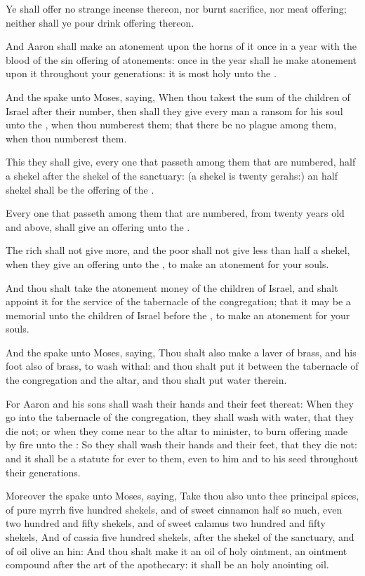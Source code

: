 \Verse Ye shall offer no strange incense thereon, nor burnt sacrifice, nor meat offering; neither shall ye pour drink offering thereon.

\Verse And Aaron shall make an atonement upon the horns of it once in a year with the blood of the sin offering of atonements: once in the year shall he make atonement upon it throughout your generations: it is most holy unto the \LORD.

\Verse And the \LORD spake unto Moses, saying, \Verse When thou takest the sum of the children of Israel after their number, then shall they give every man a ransom for his soul unto the \LORD, when thou numberest them; that there be no plague among them, when thou numberest them.

\Verse This they shall give, every one that passeth among them that are numbered, half a shekel after the shekel of the sanctuary: (a shekel is twenty gerahs:) an half shekel shall be the offering of the \LORD.

\Verse Every one that passeth among them that are numbered, from twenty years old and above, shall give an offering unto the \LORD.

\Verse The rich shall not give more, and the poor shall not give less than half a shekel, when they give an offering unto the \LORD, to make an atonement for your souls.

\Verse And thou shalt take the atonement money of the children of Israel, and shalt appoint it for the service of the tabernacle of the congregation; that it may be a memorial unto the children of Israel before the \LORD, to make an atonement for your souls.

\Verse And the \LORD spake unto Moses, saying, \Verse Thou shalt also make a laver of brass, and his foot also of brass, to wash withal: and thou shalt put it between the tabernacle of the congregation and the altar, and thou shalt put water therein.

\Verse For Aaron and his sons shall wash their hands and their feet thereat: \Verse When they go into the tabernacle of the congregation, they shall wash with water, that they die not; or when they come near to the altar to minister, to burn offering made by fire unto the \LORD: \Verse So they shall wash their hands and their feet, that they die not: and it shall be a statute for ever to them, even to him and to his seed throughout their generations.

\Verse Moreover the \LORD spake unto Moses, saying, \Verse Take thou also unto thee principal spices, of pure myrrh five hundred shekels, and of sweet cinnamon half so much, even two hundred and fifty shekels, and of sweet calamus two hundred and fifty shekels, \Verse And of cassia five hundred shekels, after the shekel of the sanctuary, and of oil olive an hin: \Verse And thou shalt make it an oil of holy ointment, an ointment compound after the art of the apothecary: it shall be an holy anointing oil.


